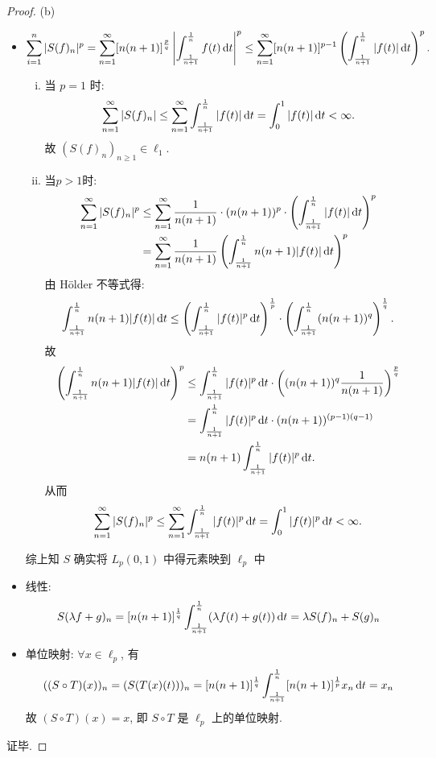 \begin{proof}
    (b)
    \begin{itemize}
    \item 
      \[\sum_{i=1}^n|S(f)_n|^p = \sum_{n=1}^{\infty}[n(n+1)]^{\frac{p}{q}}\left|\int_{\frac{1}{n+1}}^{\frac{1}{n}}f(t)\mathop{}\!\mathrm{d} t\right|^p\leq\sum_{n=1}^{\infty}[n(n+1)]^{p-1}\left(\int_{\frac{1}{n+1}}^{\frac{1}{n}}|f(t)|\mathop{}\!\mathrm{d} t\right)^p.\]
    \begin{enumerate}[(i),left=0pt]
    \item 当 $p=1$ 时:
      \[\sum_{n=1}^{\infty}|S(f)_n| 
          \leq \sum_{n=1}^{\infty}\int_{\frac{1}{n+1}}^{\frac{1}{n}}|f(t)|\mathop{}\!\mathrm{d} t
          = \int_0^1|f(t)|\mathop{}\!\mathrm{d} t<\infty.\]
      故 $(S(f)_n)_{n\geq 1}\in\ell_1$.
    \item 当$p>1$时:
      \[\begin{split}
        \sum_{n=1}^{\infty}|S(f)_n|^p
        & \leq\sum_{n=1}^{\infty}\frac{1}{n(n+1)}\cdot (n(n+1))^p\cdot\left(\int_{\frac{1}{n+1}}^{\frac{1}{n}}|f(t)|\mathop{}\!\mathrm{d} t\right)^p \\
        & = \sum_{n=1}^{\infty}\frac{1}{n(n+1)}\left(\int_{\frac{1}{n+1}}^{\frac{1}{n}}n(n+1)|f(t)|\mathop{}\!\mathrm{d} t\right)^p
      \end{split}\]
    由 H\"older 不等式得:
    \[\int_{\frac{1}{n+1}}^{\frac{1}{n}}n(n+1)|f(t)|\mathop{}\!\mathrm{d} t
      \leq \left(\int_{\frac{1}{n+1}}^{\frac{1}{n}}|f(t)|^p\mathop{}\!\mathrm{d} t\right)^{\frac{1}{p}}\cdot\left(\int_{\frac{1}{n+1}}^{\frac{1}{n}}(n(n+1))^q\right)^{\frac{1}{q}}.\]
    故
    \[\begin{split}
      \left(\int_{\frac{1}{n+1}}^{\frac{1}{n}}n(n+1)|f(t)|\mathop{}\!\mathrm{d} t\right)^p
      &\leq\int_{\frac{1}{n+1}}^{\frac{1}{n}}|f(t)|^p\mathop{}\!\mathrm{d} t\cdot\left((n(n+1))^q\frac{1}{n(n+1)}\right)^{\frac{p}{q}}\\
      &=\int_{\frac{1}{n+1}}^{\frac{1}{n}}|f(t)|^p\mathop{}\!\mathrm{d} t\cdot(n(n+1))^{(p-1)(q-1)}\\
      &=n(n+1)\int_{\frac{1}{n+1}}^{\frac{1}{n}}|f(t)|^p\mathop{}\!\mathrm{d} t.
    \end{split}\]
    从而
    \[\sum_{n=1}^{\infty}|S(f)_n|^p\leq\sum_{n=1}^{\infty}\int_{\frac{1}{n+1}}^{\frac{1}{n}}|f(t)|^p\mathop{}\!\mathrm{d} t=\int_0^1|f(t)|^p\mathop{}\!\mathrm{d} t<\infty.\]
    \end{enumerate}
    综上知 $S$ 确实将 $L_p(0,1)$ 中得元素映到 $\ell_p$ 中
    \item 线性:
    \[S(\lambda f+g)_n=[n(n+1)]^{\frac{1}{q}}\int_{\frac{1}{n+1}}^{\frac{1}{n}}(\lambda f(t)+g(t))\mathop{}\!\mathrm{d} t=\lambda S(f)_n+S(g)_n\]
    \item 单位映射: $\forall x\in\ell_p$, 有
    \[((S\circ T)(x))_n=(S(T(x)(t)))_n=[n(n+1)]^{\frac{1}{q}}\int_{\frac{1}{n+1}}^{\frac{1}{n}}[n(n+1)]^{\frac{1}{p}}x_n\mathop{}\!\mathrm{d} t=x_n\]
    故 $(S\circ T)(x)=x$, 即 $S\circ T$ 是 $\ell_p$ 上的单位映射.
    \end{itemize}
    证毕.
\end{proof}




